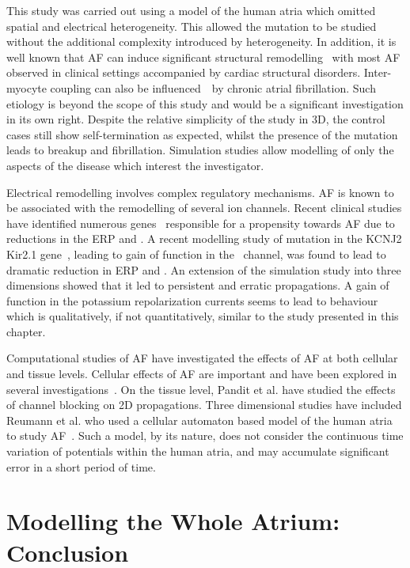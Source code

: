 This study was carried out using a model of the human atria which omitted
spatial and electrical heterogeneity.
This allowed the mutation to be studied without the additional complexity
introduced by heterogeneity.
In addition, it is well known that AF can induce significant structural
remodelling~\cite{Goette2002,Avitall2008} with most AF observed in clinical settings accompanied by cardiac
structural disorders.
Inter-myocyte coupling can also be influenced~\cite{Velden1998}\ by chronic
atrial fibrillation.
Such etiology is beyond the scope of this study and would be a significant
investigation in its own right.
Despite the relative simplicity of the study in 3D, the control cases still show
self-termination as expected, whilst the presence of the mutation leads to
breakup and fibrillation.
Simulation studies allow modelling of only the aspects of the disease which
interest the investigator.

Electrical remodelling involves complex regulatory mechanisms.
AF is known to be associated with the remodelling of several ion channels.
Recent clinical studies have identified numerous
genes~\cite{Otway2007,Xia2005,Yang2004,Restier2008,Hong2005,Ravens2008,Yang1997a,Olson2005a} responsible for a
propensity towards AF due to reductions in the ERP and \apd.
A recent modelling study of mutation in the KCNJ2 Kir2.1 gene~\cite{Kharche2008}, leading to gain
of function in the \ channel, was found to lead to dramatic reduction in
ERP and \apd.
An extension of the simulation study into three dimensions showed that it led to
persistent and erratic propagations.
A gain of function in the potassium repolarization currents seems to lead to
behaviour which is qualitatively, if not quantitatively, similar to the study
presented in this chapter.

Computational studies of AF have investigated the effects of AF at both cellular
and tissue levels.
Cellular effects of AF are important and have been explored in several
investigations~\cite{Zhang2005,Workman2001,Bosch2003}.
On the tissue level, Pandit et al. have studied the effects of channel blocking
on 2D propagations\cite{Pandit2005}.
Three dimensional studies have included Reumann et al. who used a cellular
automaton based model of the human atria to study AF~\cite{Reumann2007}.
Such a model, by its nature, does not consider the continuous time variation of
potentials within the human atria, and may accumulate significant error in a
short period of time.

\section{Modelling the Whole Atrium: Conclusion}

